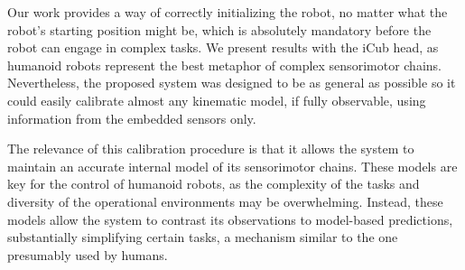 Our work provides a way of correctly initializing the
robot, no matter what the robot’s starting position might
be, which is absolutely mandatory before the robot can
engage in complex tasks. We present results with the iCub
head, as humanoid robots represent the best metaphor of
complex sensorimotor chains. Nevertheless, the proposed system was designed to be as general as possible so it could easily calibrate almost any kinematic model, if fully observable, using information from the embedded sensors only.

The relevance of this calibration procedure is that it allows the system to maintain an accurate internal model of its sensorimotor chains. These models are key for the control of humanoid robots, as the complexity of the tasks and diversity of the operational environments may be overwhelming. Instead, these models allow the system to contrast its observations to model-based predictions, substantially simplifying certain tasks, a mechanism similar to the one presumably used by humans.